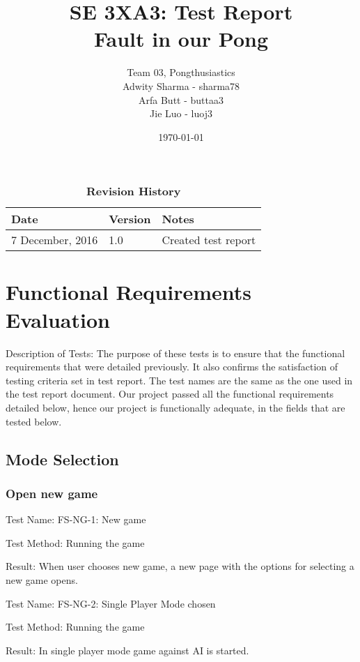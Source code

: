 \documentclass{article}
\title{SE 3XA3: Test Report\\Fault in our Pong}
\author{Team 03, Pongthusiastics 
\\ Adwity Sharma - sharma78 
\\ Arfa Butt - buttaa3 
\\ Jie Luo - luoj3 }
\date{\today}
\begin{document}
 
\newpage 
\maketitle
{}
\pagebreak

\tableofcontents
\pagebreak

\begin{table}[h] 
\caption{\bf Revision History} 
\begin{tabularx}{\textwidth}{p{3.5cm}p{2cm}X} 
\toprule {\bf Date} & {\bf Version} & {\bf Notes}\\ 
\midrule 7 December, 2016 & 1.0 & Created test report \\ 
\bottomrule \end{tabularx} \end{table}
 \newpage

\section{Functional Requirements Evaluation}
Description of Tests: The purpose of these tests is to ensure that the functional requirements that were detailed previously. It also confirms the satisfaction of testing criteria set in test report. The test names are the same as the one used in the test report document. Our project passed all the functional requirements detailed below, hence our project is functionally adequate, in the fields that are tested below. 

\subsection {Mode Selection}
\subsubsection {Open new game}
Test Name: FS-NG-1: New game \par
Test Method: Running the game \par
Result: When user chooses new game, a new page with the options for selecting a new game opens. \par

\vspace{5mm}

Test Name: FS-NG-2: Single Player Mode chosen \par
Test Method: Running the game \par
Result: In single player mode game against AI is started. \par
\end{document}
